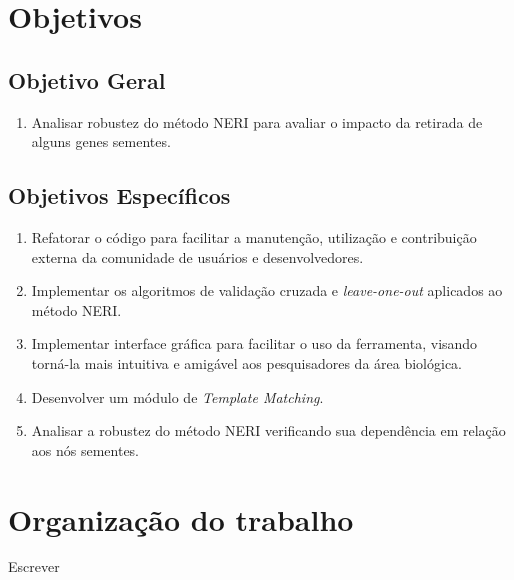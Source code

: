 






\section{Objetivos}
\subsection{Objetivo Geral}
\begin{center}
  \begin{enumerate}
  \item {Analisar robustez do método NERI para avaliar o impacto da retirada de alguns genes sementes.}

  \end{enumerate}
\end{center}

\subsection{Objetivos Específicos}
\begin{center}
  \begin{enumerate}
  \item {Refatorar o código para facilitar a manutenção, utilização e contribuição externa da comunidade de usuários e desenvolvedores.}
    \item {Implementar os algoritmos de validação cruzada e \textit{leave-one-out} aplicados ao método NERI.}
    \item{Implementar interface gráfica para facilitar o uso da ferramenta, visando torná-la mais intuitiva e amigável aos pesquisadores da área biológica.}
  \item{Desenvolver um módulo de \textit{Template Matching}.}
    \item {Analisar a robustez do método NERI verificando sua dependência em relação aos nós sementes.}
  \end{enumerate}
\end{center}


\section{Organização do trabalho}
Escrever


